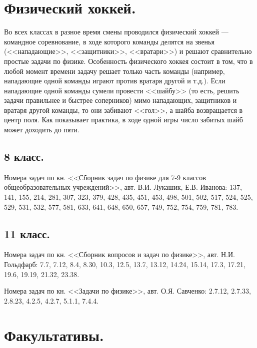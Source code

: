 \documentclass[12pt]{article}
\newlength{\h}
\begin{document}
\section{Физический хоккей.}
\label{sec:hockey}

Во всех классах в разное время смены проводился физический хоккей ---
командное соревнование, в ходе которого команды делятся на звенья
(<<нападающие>>, <<защитники>>, <<вратари>>) и решают сравнительно
простые задачи по физике. Особенность физического хоккея состоит в
том, что в любой момент времени задачу решает только часть команды
(например, нападающие одной команды играют против вратаря другой и
т.д.). Если нападающие одной команды сумели провести <<шайбу>> (то
есть, решить задачи правильнее и быстрее соперников) мимо нападающих,
защитников и вратаря другой команды, то они забивают <<гол>>, а шайба
возвращается в центр поля. Как показывает практика, в ходе одной игры
число забитых шайб может доходить до пяти. 

\subsection{8 класс. }
\label{sec:hockey8}

Номера задач по кн. <<Сборник задач по физике для 7-9 классов
общеобразовательных учреждений>>, авт. В.И. Лукашик, Е.В. Иванова:
137, 141, 155, 214, 281, 307, 323, 379, 428, 435, 451, 453, 498, 501,
502, 517, 524, 525, 529, 531, 532, 577, 581, 633, 641, 648, 650, 657,
749, 752, 754, 759, 781, 783. 

\subsection{11 класс.}
\label{sec:hockey11}

Номера задач по кн. <<Сборник вопросов и задач по физике>>,
авт. Н.И. Гольдфарб: 7.7, 7.12, 8.4, 8.30, 10.3, 12.5, 13.7, 13.12,
14.24, 15.14, 17.3, 17.21, 19.6, 19.19, 21.32, 23.38.

Номера задач по кн. <<Задачи по физике>>, авт. О.Я. Савченко: 2.7.12,
2.7.33, 2.8.23, 4.2.5, 4.2.7, 5.1.1, 7.4.4.


\clearpage
\section{Факультативы.}
\label{sec:spec}
\end{document}
